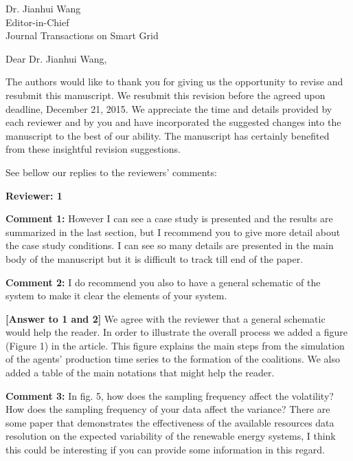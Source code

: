\documentclass{letter}
\begin{document}
\begin{letter}{Dr. Jianhui Wang \\ Editor-in-Chief \\ Journal Transactions on Smart Grid } %


\opening{ Dear Dr. Jianhui Wang,}


The authors would like to thank you for giving us the opportunity to revise and resubmit this manuscript. We resubmit this revision before the agreed upon deadline, December 21, 2015. We appreciate the time and details provided by each reviewer and by you and have incorporated the suggested changes into the manuscript to the best of our ability. The manuscript has certainly benefited from these insightful revision suggestions.


See bellow our replies to the reviewers’ comments:


\textbf{Reviewer: 1}


\textbf{Comment 1:} However I can see a case study is presented and the results are summarized in the last section, but I recommend you to give more detail about the case study conditions. I can see so many details are presented in the main body of the manuscript but it is difficult to track till end of the paper.


\textbf{Comment 2:} I do recommend you also to have a general schematic of the system to make it clear the elements of your system.


\textbf{[Answer to 1 and 2]} We agree with the reviewer that a general schematic would help the reader. In order to illustrate the overall process we added a figure (Figure 1) in the article. This figure explains the main steps from the simulation of the agents’ production time series to the formation of the coalitions. We also added a table of the main notations that might help the reader.


\textbf{Comment 3:} In fig. 5, how does the sampling frequency affect the volatility? How does the sampling frequency of your data affect the variance? There are some paper that demonstrates the effectiveness of the available resources data resolution on the expected variability of the renewable energy systems, I think this could be interesting if you can provide some information in this regard.



\end{letter}
\end{document}

